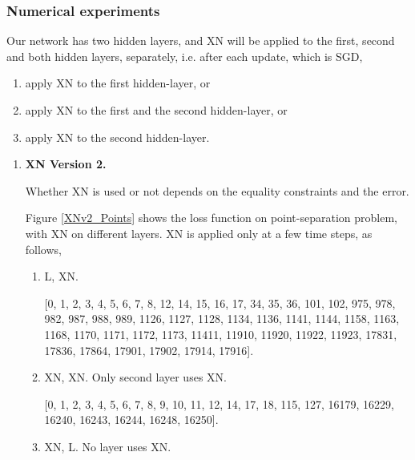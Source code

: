 \subsubsection{Numerical experiments}
Our network has two hidden layers, and XN will be applied to the first, second and both hidden layers, separately, i.e. after each update, which is SGD,
\begin{enumerate}
	\item apply XN to the first hidden-layer, or
	\item apply XN to the first and the second hidden-layer, or
	\item apply XN to the second hidden-layer.
\end{enumerate}
\begin{enumerate}
	\item \textbf{XN Version 2.} 
	
	Whether XN is used or not depends on the equality constraints and the error.
	
	Figure \ref{XNv2_Points} shows the loss function on point-separation problem, with XN on different layers. XN is applied only at a few time steps, as follows,
	\begin{enumerate}
		\item L, XN. 
		
		[0, 1, 2, 3, 4, 5, 6, 7, 8, 12, 14, 15, 16, 17, 34, 35, 36, 101, 102, 975, 978, 982, 987, 988, 989, 1126, 1127, 1128, 1134, 1136, 1141, 1144, 1158, 1163, 1168, 1170, 1171, 1172, 1173, 11411, 11910, 11920, 11922, 11923, 17831, 17836, 17864, 17901, 17902, 17914, 17916].
		\item XN, XN. Only second layer uses XN. 
		
		[0, 1, 2, 3, 4, 5, 6, 7, 8, 9, 10, 11, 12, 14, 17, 18, 115, 127, 16179, 16229, 16240, 16243, 16244, 16248, 16250].
		
		\item XN, L. No layer uses XN.
	\end{enumerate}
	

\end{enumerate}
